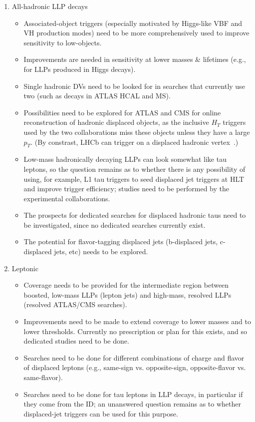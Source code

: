 \begin{enumerate}
\item All-hadronic LLP decays
	\begin{itemize}
	\item Associated-object triggers (especially motivated by Higgs-like VBF and VH production modes) need to be more comprehensively used to improve sensitivity to low-\pT objects.
	\item Improvements are needed in sensitivity at lower masses \& lifetimes (e.g., for LLPs produced in Higgs decays).
	\item Single hadronic DVs need to be looked for in searches that currently use two (such as decays in ATLAS HCAL and MS).
	\item Possibilities need to be explored for ATLAS and CMS for online reconstruction of hadronic displaced objects, as the inclusive $H_T$ triggers used by the two collaborations miss these objects unless they have a large $p_T$. (By constrast, LHCb can trigger on a displaced hadronic vertex~\cite{Aaij:2016isa,Aaij:2017mic}.)
	\item Low-mass hadronically decaying LLPs can look somewhat like tau leptons, so the question remains as to whether there is any possibility of using, for example, L1 tau triggers to seed displaced jet triggers at HLT and improve trigger efficiency; studies need to be performed by the experimental collaborations.
	\item The prospects for dedicated searches for displaced hadronic taus need to be investigated, since no dedicated searches currently exist.
        \item The potential for flavor-tagging displaced jets (b-displaced jets, c-displaced jets, etc) needs to be explored.
	\end{itemize}

\item Leptonic
	\begin{itemize}
	\item Coverage needs to be provided for the intermediate region between boosted, low-mass LLPs (lepton jets) and high-mass, resolved LLPs (resolved ATLAS/CMS searches).
	\item Improvements need to be made to extend coverage to lower masses and to lower \pT thresholds. Currently no prescription or plan for this exists, and so dedicated studies need to be done.
	\item Searches need to be done for different combinations of charge and flavor of displaced leptons (e.g., same-sign vs. opposite-sign, opposite-flavor vs. same-flavor).
	\item Searches need to be done for tau leptons in LLP decays, in particular if they come from the ID; an unanswered question remains as to whether displaced-jet triggers can be used for this purpose.
	\end{itemize}


\end{enumerate}
